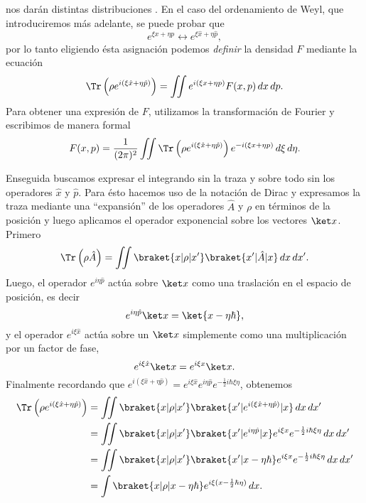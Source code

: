   nos darán distintas distribuciones
  \cite{leeTheoryApplicationQuantum1995}. En el caso del
  ordenamiento de Weyl, que introduciremos más adelante, se
  puede probar que 
  \[
    e^{\xi x + \eta p} \leftrightarrow e^{\xi \hat{x} + \eta
    \hat{p}},
  \] 
  por lo tanto eligiendo ésta asignación podemos
  \textit{definir} la densidad $F$ mediante la ecuación
  \begin{equation}
    \Tr\left(
      \rho e^{i(\xi \hat{x} + \eta \hat{p})}
    \right)
    = \iint e^{i(\xi x + \eta p)}F(x,p) \, dx \, dp.
  \end{equation}
  Para obtener una expresión de $F$, utilizamos la
  transformación de Fourier y escribimos de manera formal
  \begin{equation}
    \label{eqn:density_from_trace}
    F(x,p)
    = \frac{1}{(2\pi)^2} \iint \Tr\left( \rho 
      e^{i\left( \xi \hat{x} + \eta \hat{p} \right)} \right)
      e^{-i\left( \xi x + \eta p\right)} \, d\xi \, d\eta.
  \end{equation}

  Enseguida buscamos expresar el integrando sin la traza y
  sobre todo sin los operadores $\hat{x}$ y $\hat{p}$. Para
  ésto hacemos uso de la notación de Dirac y expresamos la
  traza mediante una ``expansión'' de los operadores
  $\hat{A}$ y $\rho$ en términos de la posición y luego
  aplicamos el operador exponencial sobre los vectores $\ket
  x$. Primero
  \begin{equation}
    \Tr\left( \rho \hat{A} \right) 
    = \iint \braket{x|\rho|x'} \braket{x'|\hat{A}|x} \, dx
    \, dx'.
  \end{equation}
  Luego, el operador $e^{i\eta \hat{p}}$ actúa sobre $\ket
  x$ como una traslación en el espacio de posición, es decir
  \[
    e^{i\eta \hat{p}} \ket x
    = \ket{x - \eta \hbar},
  \] 
  y el operador $e^{i\xi \hat{x}}$ actúa sobre un $\ket x$ 
  simplemente como una multiplicación por un factor de fase,
  \[
    e^{i\xi \hat{x}} \ket x
    = e^{i\xi x} \ket x.
  \] 
  Finalmente recordando que $e^{i(\xi \hat{x} + \eta
  \hat{p})} = e^{i \xi \hat{x}} e^{i \eta \hat{p}}
  e^{-\frac{1}{2}i\hbar \xi \eta}$, obtenemos
  \begin{align*}
    \Tr\left( \rho e^{i(\xi \hat{x} + \eta \hat{p})} \right) 
    &= \iint \braket{x|\rho|x'} \braket{x'| e^{i(\xi \hat{x}
    + \eta \hat{p})}|x} \, dx \, dx' \\
    &= \iint \braket{x|\rho|x'} \braket{x'|e^{i\eta
    \hat{p}}|x} e^{i\xi x}e^{-\frac{1}{2} i \hbar \xi \eta}
    \, dx \, dx' \\
    &=  \iint \braket{x|\rho|x'} \braket{x'|x - \eta \hbar}
    e^{i\xi x}e^{-\frac{1}{2} i \hbar \xi \eta} \, dx \, dx'
    \\
    &= \int \braket{x|\rho|x - \eta \hbar} e^{i\xi (x
    -\frac{1}{2} \hbar \eta)} \, dx.
  \end{align*}

